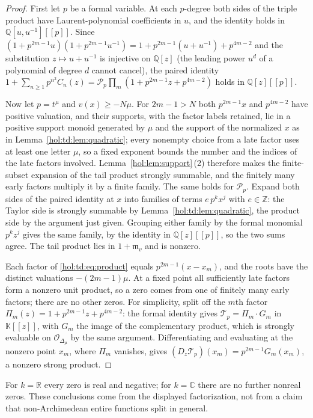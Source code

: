 \documentclass[11pt]{article}
\numberwithin{equation}{section}
\theoremstyle{definition}
\theoremstyle{remark}
\newcommand{\C}{\mathbb C}
\newcommand{\R}{\mathbb R}
\newcommand{\Q}{\mathbb Q}
\newcommand{\Z}{\mathbb Z}
\newcommand{\KK}{\mathbb K}
\begin{document}
\begin{proof}
First let $p$ be a formal variable. At each $p$-degree both sides of the triple
product have Laurent-polynomial coefficients in $u$, and the identity holds in
$\Q[u,u^{-1}][[p]]$. Since
$(1+p^{2m-1}u)(1+p^{2m-1}u^{-1})=1+p^{2m-1}(u+u^{-1})+p^{4m-2}$ and the
substitution $z\mapsto u+u^{-1}$ is injective on $\Q[z]$ (the leading power
$u^d$ of a polynomial of degree $d$ cannot cancel), the paired identity
$1+\sum_{n\ge1}p^{n^2}C_n(z)=\mathcal P_p\prod_m(1+p^{2m-1}z+p^{4m-2})$ holds
in $\Q[z][[p]]$.

Now let $p=t^\mu$ and $v(x)\ge-N\mu$. For $2m-1>N$ both $p^{2m-1}x$ and
$p^{4m-2}$ have positive valuation, and their supports, with the factor labels
retained, lie in a positive support monoid generated by $\mu$ and the support
of the normalized $x$ as in Lemma~\ref{hol:td:lem:quadratic}; every nonempty
choice from a late factor uses at least one letter $\mu$, so a fixed exponent
bounds the number and the indices of the late factors involved.
Lemma~\ref{hol:lem:support}\,(2) therefore makes the finite-subset expansion of
the tail product strongly summable, and the finitely many early factors
multiply it by a finite family. The same holds for $\mathcal P_p$. Expand both
sides of the paired identity at $x$ into families of terms $e\,p^kx^j$ with
$e\in\Z$: the Taylor side is strongly summable by
Lemma~\ref{hol:td:lem:quadratic}, the product side by the argument just given.
Grouping either family by the formal monomial $p^kz^j$ gives the same family,
by the identity in $\Q[z][[p]]$, so the two sums agree. The tail product lies
in $1+\mathfrak m_v$ and is nonzero.

Each factor of \eqref{hol:td:eq:product} equals $p^{2m-1}(x-x_m)$, and the
roots have the distinct valuations $-(2m-1)\mu$. At a fixed point all
sufficiently late factors form a nonzero unit product, so a zero comes from
one of finitely many early factors; there are no other zeros. For simplicity,
split off the $m$th factor $\Pi_m(z)=1+p^{2m-1}z+p^{4m-2}$: the formal identity
gives $\mathcal T_p=\Pi_m\cdot G_m$ in $\KK[[z]]$, with $G_m$ the image of the
complementary product, which is strongly evaluable on $\mathcal
O_{\Delta_\mu}$ by the same argument. Differentiating and evaluating at the
nonzero point $x_m$, where $\Pi_m$ vanishes, gives
$(D_z\mathcal T_p)(x_m)=p^{2m-1}G_m(x_m)$, a nonzero strong product.
\end{proof}

For $k=\R$ every zero is real and negative; for $k=\C$ there are no further
nonreal zeros. These conclusions come from the displayed factorization, not
from a claim that non-Archimedean entire functions split in general.
\end{document}
